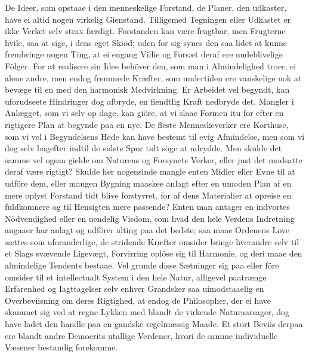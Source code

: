 \documentclass[12pt,a4paper]{article}
\newcommand{\opage}[1]{\marginnote{\footnotesize\textit{[#1]}}}
\begin{document}
De Ideer, som opstaae i den menneskelige Forstand, de Planer, den udkaster,
have ei altid nogen virkelig Gienstand. Tilligemed Tegningen eller Udkastet
er ikke Verket selv strax færdigt. Forstanden kan være frugtbar, men
Frugterne hvile, saa at sige, i dens eget Skiöd; uden for sig synes den saa
lidet at kunne frembringe nogen Ting, at ei engang Villie og Forsæt deraf
ere nudeblivelige Fölger. For at realisere sin Idee behöver den, som man i
Almindelighed troer, ei alene andre, men endog fremmede Kræfter, som
undertiden ere vanskelige nok at bevæge til en med den harmonisk
Medvirkning. Er Arbeidet vel begyndt, kan uforudseete Hindringer dog
afbryde, en fiendtlig Kraft nedbryde det. Mangler i Anlægget, som vi selv
op%
\opage{248}dage, kan giöre, at vi slaae Formen itu for efter en rigtigere Plan at
begynde paa en nye. De fleste Menneskeverker ere Korthuse, som vi vel i
Begyndelsens Hede kan have bestemt til evig Afmindelse, men som vi dog selv
bagefter indtil de sidste Spor tidt söge at udrydde. Men skulde det samme
vel ogsaa gielde om Naturens og Forsynets Verker, eller just det modsatte
deraf være rigtigt? Skulde her nogensinde mangle enten Midler eller Evne
til at udföre dem, eller mangen Bygning maaskee anlagt efter en umoden Plan
af en mere oplyst Forstand tidt blive forstyrret, for af dens Materialier at
opreise en fuldkomnere og til Hensigten mere passende? Enten man antager en
indvortes Nödvendighed eller en uendelig Visdom, som hvad den hele Verdens
Indretning angaaer har anlagt og udförer alting paa det bedste; saa maae
Ordenens Love sættes som uforanderlige, de stridende Kræfter omsider bringe
hverandre selv til et Slags svævende Ligevægt, Forvirring oplöse sig til
Harmonie, og deri maae den almindelige Tendents bestaae. Vel grunde disse
Sætninger sig paa eller före omsider til et intellectualt System i den hele
Natur, alligevel paatrænge Erfarenhed og Iagttagelser selv enhver Grandsker
saa uimodstaaelig en Overbeviisning om deres Rigtighed, at endog de
Philosopher, der ei have skammet sig ved at regne Lykken med blandt de
virkende Naturaarsager, dog have ladet den handle paa en gandske
regelmæssig Maade. Et stort Beviis derpaa ere blandt andre Democrits
utallige Verdener, hvori de samme individuelle Væsener bestandig forekomme.
\end{document}
